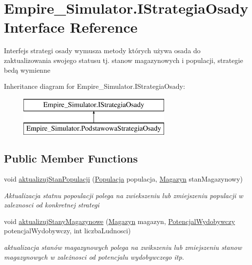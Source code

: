 \hypertarget{interface_empire___simulator_1_1_i_strategia_osady}{\section{Empire\+\_\+\+Simulator.\+I\+Strategia\+Osady Interface Reference}
\label{interface_empire___simulator_1_1_i_strategia_osady}
}


Interfejs strategi osady wymusza metody których używa osada do zaktualizowania swojego statusu tj. stanow magazynowych i populacji, strategie bedą wymienne  


Inheritance diagram for Empire\+\_\+\+Simulator.\+I\+Strategia\+Osady\+:\begin{figure}[H]
\begin{center}
\leavevmode
\includegraphics[height=2.000000cm]{interface_empire___simulator_1_1_i_strategia_osady}
\end{center}
\end{figure}
\subsection*{Public Member Functions}
\begin{DoxyCompactItemize}
\item 
void \hyperlink{interface_empire___simulator_1_1_i_strategia_osady_ac9ee9a6f745e76c2869f7561dfce9dd5}{aktualizuj\+Stan\+Populacji} (\hyperlink{class_empire___simulator_1_1_populacja}{Populacja} populacja, \hyperlink{class_empire___simulator_1_1_magazyn}{Magazyn} stan\+Magazynowy)
\begin{DoxyCompactList}\small\item\em Aktualizacja statnu popoulacji polega na zwiekszeniu lub zmiejszeniu populacji w zaleznosci od konkretnej strategi \end{DoxyCompactList}\item 
void \hyperlink{interface_empire___simulator_1_1_i_strategia_osady_a79abecf2ba585fb74915ed89fd7b06d6}{aktualizuj\+Stany\+Magazynowe} (\hyperlink{class_empire___simulator_1_1_magazyn}{Magazyn} magazyn, \hyperlink{class_empire___simulator_1_1_potencjal_wydobywczy}{Potencjal\+Wydobywczy} potencjal\+Wydobywczy, int liczba\+Ludnosci)
\begin{DoxyCompactList}\small\item\em aktualizacja stanów magazynowych polega na zwikszeniu lub zmiejszeniu stanow magazynowych w zależnosci od potencjalu wydobywczego itp. \end{DoxyCompactList}\end{DoxyCompactItemize}


